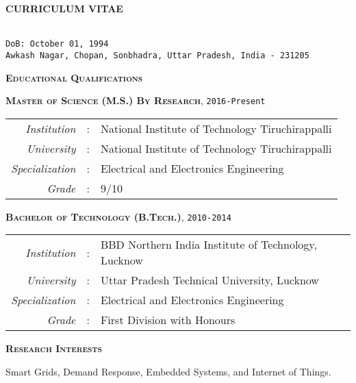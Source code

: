 {}
\centerline{\normalsize\textbf {CURRICULUM VITAE}}
\vspace{0cm}
\smallskip

\\
\texttt{DoB: October 01, 1994}\\
\texttt{Awkash Nagar, Chopan, Sonbhadra, Uttar Pradesh, India - 231205}

\noindent\textbf{\textsc{Educational Qualifications}}

\textbf{\textsc{Master of Science (M.S.) By Research}}, \texttt{2016-Present}
\begin{table}[!htbp]
\begin{tabular}{r c l}
\textit{Institution} & : & National Institute of Technology Tiruchirappalli\\
\textit{University} & : & National Institute of Technology  Tiruchirappalli\\
\textit{Specialization} & : & Electrical and Electronics Engineering \\
\textit{Grade}& : & 9/10
\end{tabular}
\end{table}

\textbf{\textsc{Bachelor of Technology (B.Tech.)}}, \texttt{2010-2014}
\begin{table}[!htbp]
\begin{tabular}{r c l}
\textit{Institution} & : & BBD Northern India Institute of Technology, Lucknow\\
\textit{University} & : & Uttar Pradesh Technical University, Lucknow\\
\textit{Specialization} & : & Electrical and Electronics Engineering\\
\textit{Grade} & : & First Division with Honours
\end{tabular}
\end{table}

\noindent \textbf{\textsc{Research Interests}}

Smart Grids, Demand Response, Embedded Systems, and Internet of Things.